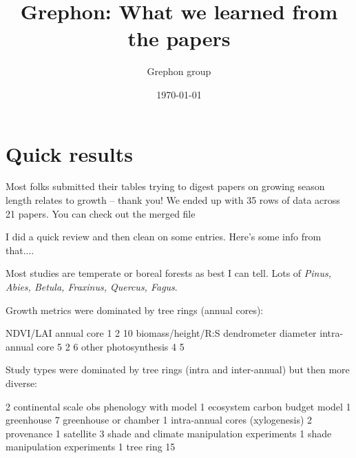 \documentclass[11pt]{article}
\begin{document}
\renewcommand{\refname}{\CHead{}}

\title{Grephon: What we learned from the papers}
\date{\today}
\author{Grephon group} 
\maketitle

\tableofcontents

\section{Quick results}

Most folks submitted their tables trying to digest papers on growing season length relates to growth -- thank you! We ended up with 35 rows of data across 21 papers. You can check out the merged file 

I did a quick review and then clean on some entries. Here's some info from that....

Most studies are temperate or boreal forests as best I can tell. Lots of \emph{Pinus, Abies, Betula, Fraxinus, Quercus, Fagus}.

Growth metrics were dominated by tree rings (annual cores):
\begin{Schunk}
\begin{Soutput}
                                 NDVI/LAI          annual core 
                   1                    2                   10 
  biomass/height/R:S dendrometer diameter    intra-annual core 
                   5                    2                    6 
               other       photosynthesis 
                   4                    5 
\end{Soutput}
\end{Schunk}

\newpage
Study types were dominated by tree rings (intra and inter-annual) but then more diverse:
\begin{Schunk}
\begin{Soutput}
                                         2 
continental scale obs phenology with model 
                                         1 
             ecosystem carbon budget model 
                                         1 
                                greenhouse 
                                         7 
                     greenhouse or chamber 
                                         1 
          intra-annual cores (xylogenesis) 
                                         2 
                                provenance 
                                         1 
                                 satellite 
                                         3 
shade and climate manipulation experiments 
                                         1 
            shade manipulation experiments 
                                         1 
                                 tree ring 
                                        15 
\end{Soutput}
\end{Schunk}
\newpage
\end{document}
